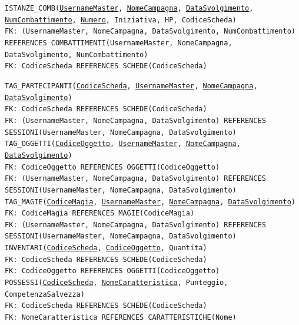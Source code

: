 \documentclass[a4paper,12pt]{report}
\begin{document}
\noindent \texttt{ISTANZE\_COMB(\underline{UsernameMaster}, \underline{NomeCampagna}, \underline{DataSvolgimento}, \underline{NumCombattimento}, \underline{Numero}, Iniziativa, HP, CodiceScheda)} \\
\texttt{FK: (UsernameMaster, NomeCampagna, DataSvolgimento, NumCombattimento) REFERENCES COMBATTIMENTI(UsernameMaster, NomeCampagna, DataSvolgimento, NumCombattimento)} \\
\texttt{FK: CodiceScheda REFERENCES SCHEDE(CodiceScheda)} \\

\newpage

\noindent \texttt{TAG\_PARTECIPANTI(\underline{CodiceScheda}, \underline{UsernameMaster}, \underline{NomeCampagna}, \underline{DataSvolgimento})} \\
\texttt{FK: CodiceScheda REFERENCES SCHEDE(CodiceScheda)} \\
\texttt{FK: (UsernameMaster, NomeCampagna, DataSvolgimento) REFERENCES SESSIONI(UsernameMaster, NomeCampagna, DataSvolgimento)} \\

\noindent \texttt{TAG\_OGGETTI(\underline{CodiceOggetto}, \underline{UsernameMaster}, \underline{NomeCampagna}, \underline{DataSvolgimento})} \\
\texttt{FK: CodiceOggetto REFERENCES OGGETTI(CodiceOggetto)} \\
\texttt{FK: (UsernameMaster, NomeCampagna, DataSvolgimento) REFERENCES SESSIONI(UsernameMaster, NomeCampagna, DataSvolgimento)} \\

\noindent \texttt{TAG\_MAGIE(\underline{CodiceMagia}, \underline{UsernameMaster}, \underline{NomeCampagna}, \underline{DataSvolgimento})} \\
\texttt{FK: CodiceMagia REFERENCES MAGIE(CodiceMagia)} \\
\texttt{FK: (UsernameMaster, NomeCampagna, DataSvolgimento) REFERENCES SESSIONI(UsernameMaster, NomeCampagna, DataSvolgimento)} \\

\noindent \texttt{INVENTARI(\underline{CodiceScheda}, \underline{CodiceOggetto}, Quantita)} \\
\texttt{FK: CodiceScheda REFERENCES SCHEDE(CodiceScheda)} \\
\texttt{FK: CodiceOggetto REFERENCES OGGETTI(CodiceOggetto)} \\

\noindent \texttt{POSSESSI(\underline{CodiceScheda}, \underline{NomeCaratteristica}, Punteggio, CompetenzaSalvezza)} \\
\texttt{FK: CodiceScheda REFERENCES SCHEDE(CodiceScheda)} \\
\texttt{FK: NomeCaratteristica REFERENCES CARATTERISTICHE(Nome)} \\
\end{document}
